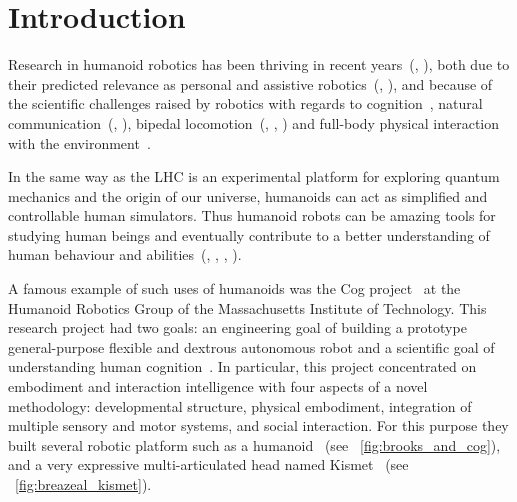 
\chapter{Introduction} %


Research in humanoid robotics has been thriving in recent years~(\cite{hirai1998development}, \cite{kaneko2008humanoid}), both due to their predicted relevance as personal and assistive robotics~(\cite{tapus2007socially}, \cite{oztop2005human}), and because of the scientific challenges raised by robotics with regards to cognition~\parencite{asada2001cognitive}, natural communication~(\cite{stiefelhagen2004natural}, \cite{breazeal2002robots}), bipedal locomotion~(\cite{yamaguchi1999development}, \cite{chestnutt2005footstep}, \cite{collins2005bipedal}) and full-body physical interaction with the environment~\parencite{ude2004programming}.

In the same way as the LHC is an experimental platform for exploring quantum mechanics and the origin of our universe, humanoids can act as simplified and controllable human simulators. Thus humanoid robots can be amazing tools for studying human beings and eventually contribute to a better understanding of human behaviour and abilities~(\cite{atkeson2000using}, \cite{cheng2007cb}, \cite{brooks1986achieving}, \cite{oudeyer2010impact}).

A famous example of such uses of humanoids was the Cog project~\parencite{brooks1999cog} at the Humanoid Robotics Group of the Massachusetts Institute of Technology. This research project had two goals: an engineering goal of building a prototype general-purpose flexible and dextrous autonomous robot and a scientific goal of understanding human cognition~\parencite{brooks1994building}. In particular, this project concentrated on embodiment and interaction intelligence with four aspects of a novel methodology: developmental structure, physical embodiment, integration of multiple sensory and motor systems, and social interaction. For this purpose they built several robotic platform such as a humanoid~\parencite{brooks1999cog} (see \figurename~\ref{fig:brooks_and_cog}), and a very expressive multi-articulated head named Kismet~\parencite{breazeal2003emotion} (see \figurename~\ref{fig:breazeal_kismet}).



